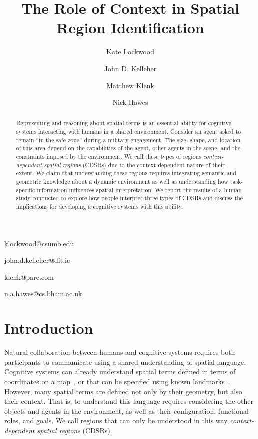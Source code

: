 \documentclass[11pt,letterpaper]{article}
\begin{document}
 

\title{The Role of Context in Spatial Region Identification}
 
\author{Kate Lockwood}{klockwood@csumb.edu}
\address{ITCD Department, California State University - Monterey Bay}
\author{John D. Kelleher}{john.d.kelleher@dit.ie}
\address{Applied Intelligence Research Centre, Dublin Institute of Technology }
\author{Matthew Klenk}{klenk@parc.com}
\address{Palo Alto Research Center, Palo Alto CA }
\author{Nick Hawes}{n.a.hawes@cs.bham.ac.uk}
\address{School of Computer Science, University of Birmingham, UK }
\vskip 0.2in
 
\begin{abstract}
Representing and reasoning about spatial terms is an essential ability for cognitive systems interacting with humans in a shared environment.  Consider an agent asked to remain ``in the safe zone'' during a military engagement.  The size, shape, and location of this area depend on the capabilities of the agent, other agents in the scene, and the constraints imposed by the environment.  We call these types of regions \textit{context-dependent spatial regions} (CDSRs) due to the context-dependent nature of their extent.  We claim that understanding these regions requires integrating semantic and geometric knowledge about a dynamic environment as well as understanding how task-specific information influences spatial interpretation.  We report the results of a human study conducted to explore how people interpret three types of CDSRs and discuss the implications for developing a cognitive systems with this ability.
\end{abstract}

\section{Introduction} 
Natural collaboration between humans and cognitive systems requires both participants to communicate using a shared understanding of spatial language.  Cognitive systems can already understand spatial terms defined in terms of coordinates on a map~\cite{Zender2008a}, or that can be specified using known landmarks~\cite{brenneretal07ijcai}.  However, many spatial terms are defined not only by their geometry, but also their context.  That is, to understand this language requires considering the other objects and agents in the environment, as well as their configuration, functional roles, and goals.  We call regions that can only be understood in this way \textit{context-dependent spatial regions} (CDSRs).
\end{document}

